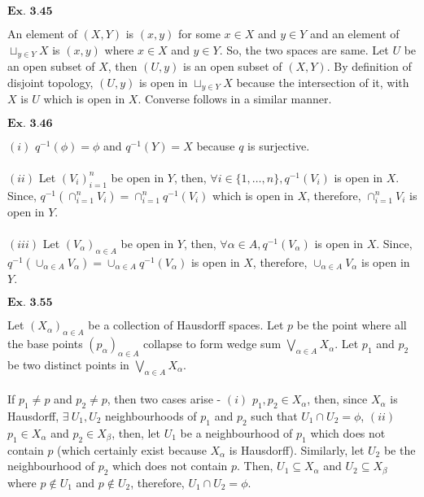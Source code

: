 \documentclass{article}
\begin{document}
\vspace{0.2in}

${\textbf{Ex. 3.45}}$

An element of $(X,Y)$ is $(x,y)$ for some $x \in X$ and $y \in Y$ and an element of $\sqcup_{y\in Y}X$ is $(x,y)$ where $x \in X$ and $y \in Y$. So, the two spaces are same. Let $U$ be an open subset of $X$, then $(U,y)$ is an open subset of $(X,Y)$. By definition of disjoint topology, $(U,y)$ is open in $\sqcup_{y\in Y}X$ because the intersection of it, with $X$ is $U$ which is open in $X$. Converse follows in a similar manner.

\vspace{0.2in}

${\textbf{Ex. 3.46}}$

$(i)$ $q^{-1}(\phi) = \phi$ and $q^{-1}(Y) = X$ because $q$ is surjective.\\~\\

$(ii)$ Let $(V_i)_{i=1}^{n}$ be open in $Y$, then, $\forall i \in \{1,\ldots,n\},q^{-1}(V_i)$ is open in $X$. Since, $q^{-1}(\cap_{i=1}^{n}V_i) = \cap_{i=1}^{n}q^{-1}(V_i)$ which is open in $X$, therefore, $\cap_{i=1}^{n}V_i$ is open in $Y$.\\~\\

$(iii)$ Let $(V_\alpha)_{\alpha \in A}$ be open in $Y$, then, $\forall \alpha \in A, q^{-1}(V_\alpha)$ is open in $X$. Since, $q^{-1}(\cup_{\alpha\in A}V_\alpha) = \cup_{\alpha \in A}q^{-1}(V_\alpha)$ is open in $X$, therefore, $\cup_{\alpha \in A}V_{\alpha}$ is open in $Y$. 


\vspace{0.2in}

${\textbf{Ex. 3.55}}$

Let $(X_{\alpha})_{\alpha \in A}$ be a collection of Hausdorff spaces. Let $p$ be the point where all the base points $(p_{\alpha})_{\alpha \in A}$ collapse to form wedge sum $\bigvee_{\alpha \in A} X_{\alpha}$. Let $p_1$ and $p_2$ be two distinct points in $\bigvee_{\alpha \in A} X_{\alpha}$.\\~\\

If $p_1 \neq p$ and $p_2 \neq p$, then two cases arise - $(i)$ $p_1, p_2 \in X_{\alpha}$, then, since $X_{\alpha}$ is Hausdorff, $\exists\ U_1, U_2$ neighbourhoods of $p_1$ and $p_2$ such that $U_1 \cap U_2 = \phi$, $(ii)$ $p_1 \in X_{\alpha}$ and $p_2 \in X_{\beta}$, then, let $U_1$ be a neighbourhood of $p_1$ which does not contain $p$ (which certainly exist because $X_{\alpha}$ is Hausdorff). Similarly, let $U_2$ be the neighbourhood of $p_2$ which does not contain $p$. Then, $U_1 \subseteq X_{\alpha}$ and $U_2 \subseteq X_{\beta}$ where $p \not\in U_1$ and $p \not\in U_2$, therefore, $U_1 \cap U_2 = \phi$.\\~\\
\end{document}
